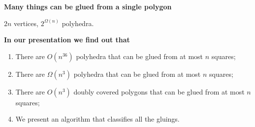 \documentclass[11pt]{article}
\begin{document}








\newpage \begin{center}
	{\Large\bfseries Many things can be glued from a single polygon} \vspace{0.65cm}

   \vspace{0.65cm}

$2n$ vertices, $2^{\Omega(n)}$ polyhedra.
\end{center}


\newpage \begin{center}
	{\Large\bfseries In our presentation we find out that}
\end{center} \vspace{1cm}

\begin{enumerate}
	\item There are $O(n^{36})$ polyhedra that can be glued from at most $n$ squares; \medskip
	\item There are $\Omega(n^3)$ polyhedra that can be glued from at most $n$ squares; \medskip
	\item There are $O(n^3)$ doubly covered polygons that can be glued from at most $n$ squares;
	\item We present an algorithm that classifies all the gluings.
\end{enumerate}
\end{document}
